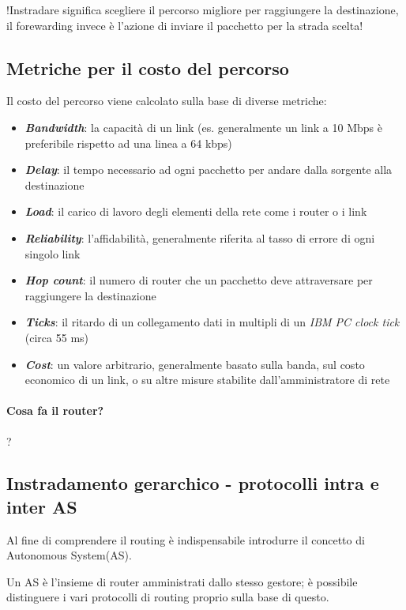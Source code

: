 !Instradare significa scegliere il percorso migliore per raggiungere la destinazione, il forewarding invece è l'azione di inviare il pacchetto per la strada scelta!

\subsection{Metriche per il costo del percorso}
Il costo del percorso viene calcolato sulla base di diverse metriche:
\begin{itemize}
    \item \textbf{\textit{Bandwidth}}: la capacità di un link (es. generalmente un link a 10 Mbps è preferibile rispetto ad una linea a 64 kbps)
    \item \textbf{\textit{Delay}}: il tempo necessario ad ogni pacchetto per andare dalla sorgente alla destinazione
    \item \textbf{\textit{Load}}: il carico di lavoro degli elementi della rete come i router o i link
    \item \textbf{\textit{Reliability}}: l'affidabilità, generalmente riferita al tasso di errore di ogni singolo link
    \item \textbf{\textit{Hop count}}: il numero di router che un pacchetto deve attraversare per raggiungere la destinazione
    \item \textbf{\textit{Ticks}}: il ritardo di un collegamento dati in multipli di un \textit{IBM PC clock tick} (circa 55 ms)
    \item \textbf{\textit{Cost}}: un valore arbitrario, generalmente basato sulla banda, sul costo economico di un link, o su altre misure stabilite dall'amministratore di rete
\end{itemize}

\paragraph{Cosa fa il router?}
?

\subsection{Instradamento gerarchico - protocolli intra e inter AS}
Al fine di comprendere il routing è indispensabile introdurre il concetto di Autonomous System(AS).

Un AS è l'insieme di router amministrati dallo stesso gestore; è possibile distinguere i vari protocolli di routing proprio sulla base di questo.

